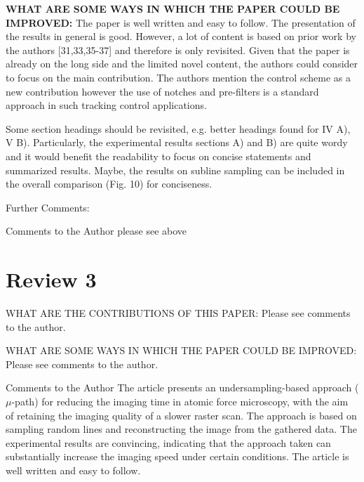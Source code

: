 \documentclass[11pt]{article} %
\makeatletter
\renewenvironment{leftbar}[1]
{%
    \def\FrameCommand
    {%
        {\color{#1}\vrule width 3pt}%
        \hspace{0pt}%
        \fboxsep=\FrameSep\colorbox{lightgray}%
    }%
    \MakeFramed{\hsize \hsize\advance\hsize-\width\FrameRestore}%
}
{\endMakeFramed}
\newcommand{\listintertext}{\@ifstar\listintertext@\listintertext@}
\newcommand{\listintertext@}[1]{%
  \hspace*{-\@totalleftmargin}
  \parbox{\textwidth}{
    \setlength{\parindent}{24pt}
    #1
    }}
\newcommand{\itemaddr}[2]{\begin{leftbar}{#1} \item{#2}\end{leftbar}}
\makeatother
\begin{document}
\textbf{WHAT ARE SOME WAYS IN WHICH THE PAPER COULD BE IMPROVED:} The paper is well written and easy to follow. The presentation of the results in general is good. However, a lot of content is based on prior work by the authors [31,33,35-37] and therefore is only revisited. Given that the paper is already on the long side and the limited novel content, the authors could consider to focus on the main contribution. The authors mention the control scheme as a new contribution however the use of notches and pre-filters is a standard approach in such tracking control applications. 

Some section headings should be revisited, e.g. better headings found for IV A), V B). Particularly, the experimental results sections A) and B) are quite wordy and it would benefit the readability to focus on concise statements and summarized results. Maybe, the results on subline sampling can be included in the overall comparison (Fig. 10) for conciseness. 

Further Comments:

Comments to the Author
please see above

\section{Review 3}

WHAT ARE THE CONTRIBUTIONS OF THIS PAPER: Please see comments to the author.

WHAT ARE SOME WAYS IN WHICH THE PAPER COULD BE IMPROVED: Please see comments to the author.

Comments to the Author
The article presents an undersampling-based approach ($\mu$-path) for reducing the imaging time in atomic force microscopy, with the aim of retaining the imaging quality of a slower raster scan. The approach is based on sampling random lines and reconstructing the image from the gathered data. The experimental results are convincing, indicating that the approach taken can substantially increase the imaging speed under certain conditions. The article is well written and easy to follow.
\end{document}
